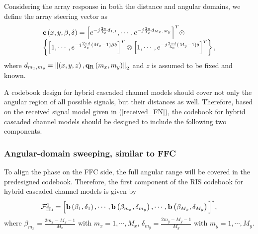 \documentclass[lettersize, journal]{IEEEtran}
\begin{document}
Considering the array response in both the distance and angular domains, we define the array steering vector as 
\begin{equation}\label{steering_polar}
\begin{array}{l}
{{\bf{c}}}\left( {x, y, \beta, \delta } \right) = \Big[ {e^{-j\frac{{2\pi }}{\lambda_c }d_{1,1} }}, \cdots, {e^{-j\frac{{2\pi }}{\lambda_c }d_{M_x, M_y} }}  \Big]^T \odot   \\ 
\left\{ \Big[ 1, \cdots ,{e^{-j\frac{{2\pi d}}{\lambda_c }{\left( {{M_x} - 1} \right) \beta  \delta} }} \Big]^T \otimes {\Big[ 1, \cdots ,e^{-j\frac{{2\pi d}}{\lambda_c } { \left( {{M_y} - 1} \right) \delta } }} \Big]^T \right\}, 
\end{array}
\end{equation}
where $d_{m_x, m_y} = \left \| \left( x, y, z \right),  {\bf{q}}_{\rm{R}}\left( m_x, m_y \right) \right \|_2$ and $z$ is assumed to be fixed and known.

A codebook design for hybrid cascaded channel models should cover not only the angular region of all possible signals, but their distances as well. 
Therefore, based on the received signal model given in ({\ref{received_FN}}),  the codebook for hybrid cascaded channel models should be designed to include the following two components.

\subsubsection{Angular-domain sweeping, similar to FFC}
To align the phase on the FFC side, the full angular range will be covered in the predesigned codebook. 
Therefore, the first component of the RIS codebook for hybrid cascaded channel models is given by
\begin{equation}\label{Codebook_Hy1}
\begin{array}{l}
{\cal{F}}_{\rm{Hb}}^1=\Big[ {\bf{b}}\left( \beta_1, \delta_1 \right), \cdots, {\bf{b}}\left( \beta_{m_x}, \delta_{m_y} \right), \cdots, {\bf{b}}\left( \beta_{M_x}, \delta_{M_y} \right) \Big]^*,
\end{array}
\end{equation}
where $\beta_{m_x} = \frac{2{m_x}-{M_x}-1}{M_x}$ with ${m_x} = 1, \cdots, {M_x}$,  $\delta_{m_y} = \frac{2{m_y}-{M_y}-1}{M_y}$ with ${m_y} = 1, \cdots, {M_y}$.
\end{document}
